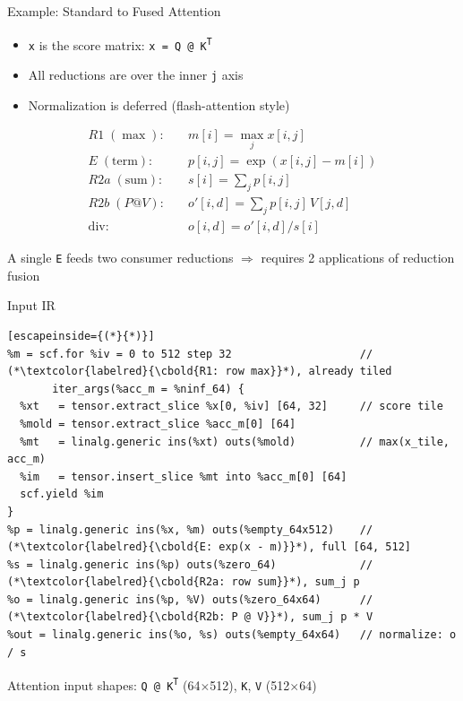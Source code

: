 \documentclass[10pt, aspectratio=169]{beamer}
\newcommand{\code}[1]{\texttt{\small #1}}
\newcommand{\takeawaybox}[2][inteltitle!12]{%
  \colorbox{#1}{%
    \parbox{\dimexpr\textwidth-2\fboxsep\relax}{\centering\vspace{1mm}
      #2\vspace{1mm}}}}
\newcommand{\takeaway}[1]{\par\vspace{2mm}\noindent\takeawaybox{#1}\par\vspace{2.5mm}}
\newcommand{\cbold}[1]{{\fontencoding{T1}\fontfamily{lmtt}\fontseries{b}\selectfont\frenchspacing #1}}
\begin{document}
\begin{frame}{Example: Standard to Fused Attention}
  \begin{itemize}\small
    \item \code{x} is the score matrix: \code{x = Q @ K\textsuperscript{T}}
    \item All reductions are over the inner \code{j} axis
    \item Normalization is deferred (flash-attention style)
  \end{itemize}
  \[
  \begin{aligned}
    R1 \;(\max):&\quad m[i]    = \max_j x[i,j] \\
    E \;(\text{term}):&\quad p[i,j]  = \exp(x[i,j] - m[i]) \\
    R2a \;(\text{sum}):&\quad s[i]    = \textstyle\sum_j p[i,j] \\
    R2b \;(P@V):&\quad o'[i,d] = \textstyle\sum_j p[i,j]\, V[j,d] \\
    \text{div}:&\quad o[i,d]  = o'[i,d] / s[i]
  \end{aligned}
  \]
  \takeaway{A single \code{E} feeds two consumer reductions $\Rightarrow$ requires
    \alert{2} applications of reduction fusion}
\end{frame}

\begin{frame}[fragile]{Input IR}
\begin{lstlisting}[escapeinside={(*}{*)}]
%m = scf.for %iv = 0 to 512 step 32                    // (*\textcolor{labelred}{\cbold{R1: row max}}*), already tiled
       iter_args(%acc_m = %ninf_64) {
  %xt   = tensor.extract_slice %x[0, %iv] [64, 32]     // score tile
  %mold = tensor.extract_slice %acc_m[0] [64]
  %mt   = linalg.generic ins(%xt) outs(%mold)          // max(x_tile, acc_m)
  %im   = tensor.insert_slice %mt into %acc_m[0] [64]
  scf.yield %im
}
%p = linalg.generic ins(%x, %m) outs(%empty_64x512)    // (*\textcolor{labelred}{\cbold{E: exp(x - m)}}*), full [64, 512]
%s = linalg.generic ins(%p) outs(%zero_64)             // (*\textcolor{labelred}{\cbold{R2a: row sum}}*), sum_j p
%o = linalg.generic ins(%p, %V) outs(%zero_64x64)      // (*\textcolor{labelred}{\cbold{R2b: P @ V}}*), sum_j p * V
%out = linalg.generic ins(%o, %s) outs(%empty_64x64)   // normalize: o / s
\end{lstlisting}
  \takeaway{Attention input shapes: \code{Q @ K\textsuperscript{T}} (64$\times$512),
    \code{K}, \code{V} (512$\times$64)}
\end{frame}
\end{document}
